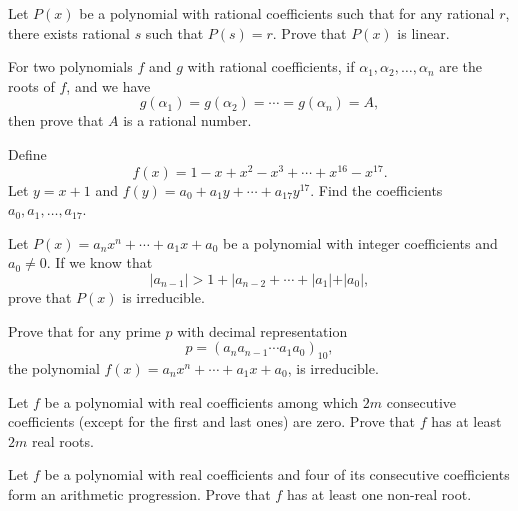 \documentclass[12pt,a4paper]{memoir}
\theoremstyle{definition}
\begin{document}
\begin{question}[name={1998 Iran}]
	Let $P(x)$ be a polynomial with rational coefficients such that for any rational $r$, there exists rational $s$ such that $P(s)=r$. Prove that $P(x)$ is linear.
\end{question}



\begin{question}[name={1998 Iran}]
	For two polynomials $f$ and $g$ with rational coefficients, if $\alpha_1,\alpha_2,\dots,\alpha_n$ are the roots of $f$, and we have
	\[g(\alpha_1)=g(\alpha_2)=\cdots = g(\alpha_n) = A,\] then prove that $A$ is a rational number.
\end{question}




\begin{question}[name={1998 Iran}]
	Define \[f(x)=1-x+x^2-x^3+\cdots+x^{16}-x^{17}.\]
	Let $y=x+1$ and $f(y)=a_0+a_1y+\cdots+a_{17}y^{17}$. Find the coefficients $a_0,a_1,\dots,a_{17}$.
\end{question}



\begin{question}[name={1998 Iran}]
	Let $P(x)=a_nx^n+\cdots+a_1x+a_0$ be a polynomial with integer coefficients and $a_0\neq 0$. If we know that \[|a_{n-1}| > 1 + |a_{n-2} + \cdots + |a_1| + |a_0|,\] prove that $P(x)$ is irreducible.
\end{question}



\begin{question}[name={1998 Iran}]
	Prove that for any prime $p$ with decimal representation \[p=(a_na_{n-1}\cdots a_1a_0)_{10},\] the polynomial $f(x)=a_nx^n+\cdots+a_1x+a_0$, is irreducible.
\end{question}



\begin{question}[name={1998 Iran}]
	Let $f$ be a polynomial with real coefficients among which $2m$ consecutive coefficients (except for the first and last ones) are zero. Prove that $f$ has at least $2m$ real roots.
\end{question}



\begin{question}[name={1998 Iran}]
	Let $f$ be a polynomial with real coefficients and four of its consecutive coefficients form an arithmetic progression. Prove that $f$ has at least one non-real root.
\end{question}
\end{document}
